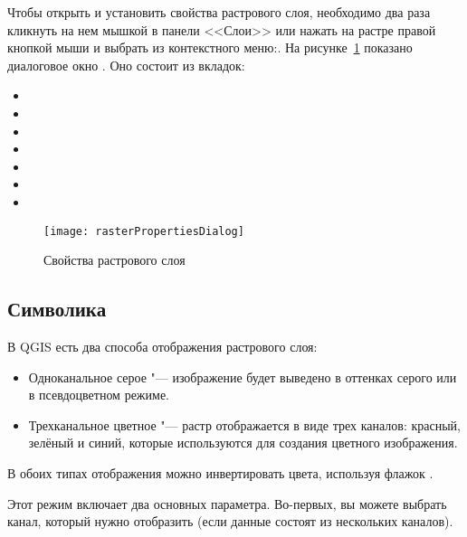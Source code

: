 Чтобы открыть и установить свойства растрового слоя, необходимо два раза
кликнуть на нем мышкой в панели <<Слои>> или нажать на растре правой
кнопкой мыши и выбрать  из контекстного
меню:. На рисунке~\ref{fig:raster_properties}
показано диалоговое окно . Оно состоит из
вкладок:

\begin{itemize}[label=--]
 \item {}
 \item {}
 \item {}
 \item {}
 \item {}
 \item {}
 \item {}
\end{itemize}

\begin{figure}[h]
  \centering
   \texttt{[image: rasterPropertiesDialog]}
   \caption{Свойства растрового слоя \wincaption}\label{fig:raster_properties}
\end{figure}

\subsection{Символика}\label{label_symbology}

В QGIS есть два способа отображения растрового слоя:

\begin{itemize}[label=--]
\item Одноканальное серое "--- изображение будет выведено в оттенках серого
или в псевдоцветном режиме. %
\item Трехканальное цветное "--- растр отображается в виде трех каналов:
красный, зелёный и синий, которые используются для создания цветного
изображения.
\end{itemize}

В обоих типах отображения можно инвертировать цвета, используя флажок
. %


Этот режим включает два основных параметра. Во-первых, вы можете выбрать канал,
который нужно отобразить (если данные состоят из нескольких каналов).

